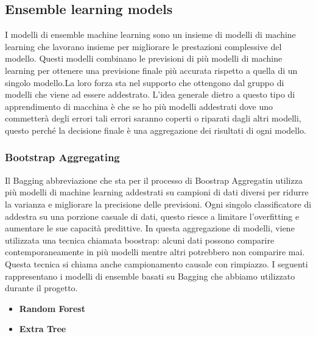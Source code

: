 \documentclass[italian,12pt,a4paper]{article}
\begin{document}
    \subsection{Ensemble learning models}
    I modelli di ensemble machine learning sono un insieme di modelli di machine learning che lavorano insieme per migliorare le prestazioni complessive del modello. Questi modelli combinano le previsioni di più modelli di machine learning per ottenere una previsione finale più accurata rispetto a quella di un singolo modello.La loro forza sta nel supporto che ottengono dal gruppo di modelli che viene ad essere addestrato. L'idea generale dietro a questo tipo di apprendimento di macchina è che se ho più modelli addestrati dove uno commetterà degli errori tali errori saranno coperti o riparati dagli altri modelli, questo perché la decisione finale è una aggregazione dei risultati di ogni modello.
    \\
    \vspace{25pt}

    \subsubsection{Bootstrap Aggregating}
    Il Bagging abbreviazione che sta per il processo di Boostrap Aggregatin utilizza più modelli di machine learning addestrati su campioni di dati diversi per ridurre la varianza e migliorare la precisione delle previsioni. Ogni singolo classificatore di addestra su una porzione casuale di dati, questo riesce a limitare l’overfitting e aumentare le sue capacità predittive. In questa aggregazione di modelli, viene utilizzata una tecnica chiamata boostrap: alcuni dati possono comparire contemporaneamente in più modelli mentre altri potrebbero non comparire mai. Questa tecnica si chiama anche campionamento causale con rimpiazzo. I seguenti rappresentano i modelli di ensemble basati su Bagging che abbiamo utilizzato durante il progetto.
    \\
    \vspace{25pt}

    \begin{itemize}
		\item \textbf{Random Forest}
		\item \textbf{Extra Tree}
    \end{itemize}

    \vspace{25pt}
\end{document}
